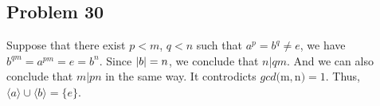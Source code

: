 \subsection*{Problem 30}
\noindent Suppose that there exist $p < m$, $q < n$ such that $a^p = b^q \neq e$, we have $b^{qm} = a^{pm} = e = b^n$. Since $\left\lvert b \right\rvert = n$, we conclude that $n | qm$. And we can also conclude that $m | pn$ in the same way. It controdicts $gcd($m$, $n$) = 1$. Thus, $\langle a \rangle \cup \langle b \rangle = \{e\}$.

